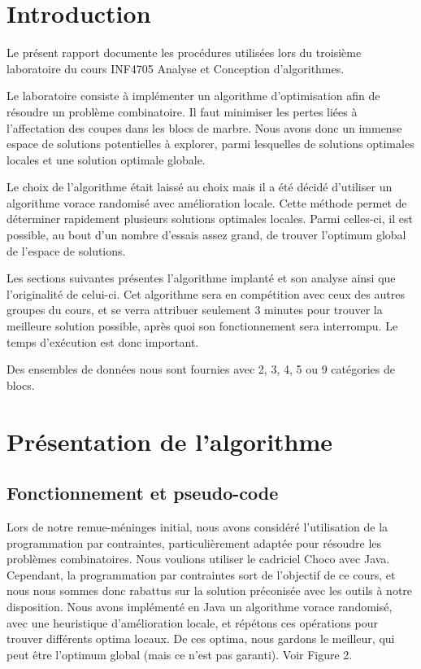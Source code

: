 \documentclass[10pt,a4paper]{article}
\begin{document}
\newpage

\hfill

\newpage

\tableofcontents

\newpage

\section{Introduction}

Le présent rapport documente les procédures utilisées lors du troisième laboratoire du cours INF4705 Analyse et Conception d'algorithmes.

Le laboratoire consiste à implémenter un algorithme d’optimisation afin de résoudre un problème combinatoire. Il faut minimiser les pertes liées à l’affectation des coupes dans les blocs de marbre. Nous avons donc un immense espace de solutions potentielles à explorer, parmi lesquelles de solutions optimales locales et une solution optimale globale.

Le choix de l’algorithme était laissé au choix mais il a été décidé d’utiliser un algorithme vorace randomisé avec amélioration locale. Cette méthode permet de déterminer rapidement plusieurs solutions optimales locales. Parmi celles-ci, il est possible, au bout d'un nombre d'essais assez grand, de trouver l'optimum global de l'espace de solutions.

Les sections suivantes présentes l’algorithme implanté et son analyse ainsi que l’originalité de celui-ci. Cet algorithme sera en compétition avec ceux des autres groupes du cours, et se verra attribuer seulement 3 minutes pour trouver la meilleure solution possible, après quoi son fonctionnement sera interrompu. Le temps d'exécution est donc important.

Des ensembles de données nous sont fournies avec 2, 3, 4, 5 ou 9 catégories de blocs.

\newpage

\section{Présentation de l'algorithme}

\subsection{Fonctionnement et pseudo-code}

Lors de notre remue-méninges initial, nous avons considéré l'utilisation de la programmation par contraintes, particulièrement adaptée pour résoudre les problèmes combinatoires. Nous voulions utiliser le cadriciel Choco avec Java.
Cependant, la programmation par contraintes sort de l'objectif de ce cours, et nous nous sommes donc rabattus sur la solution préconisée avec les outils à notre disposition. Nous avons implémenté en Java un algorithme vorace randomisé, avec une heuristique d'amélioration locale, et répétons ces opérations pour trouver différents optima locaux. De ces optima, nous gardons le meilleur, qui peut être l'optimum global (mais ce n'est pas garanti). Voir Figure 2.
\end{document}
